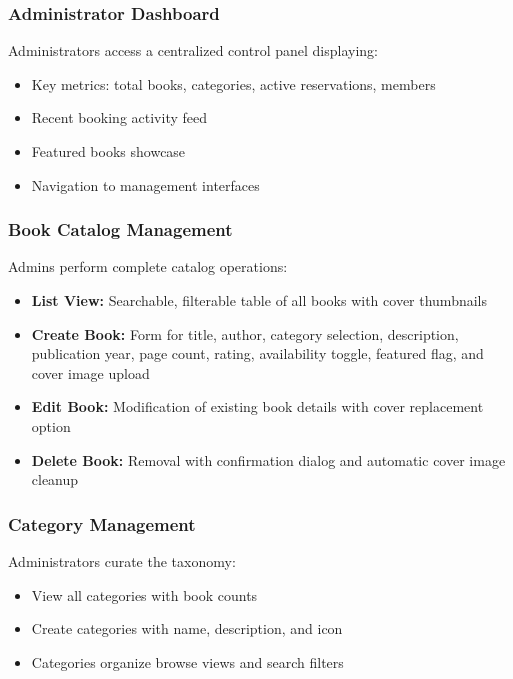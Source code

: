 \documentclass[12pt,a4paper]{article}
\begin{document}
\subsubsection{Administrator Dashboard}

Administrators access a centralized control panel displaying:

\begin{itemize}[leftmargin=*]
    \item Key metrics: total books, categories, active reservations, members
    \item Recent booking activity feed
    \item Featured books showcase
    \item Navigation to management interfaces
\end{itemize}

\subsubsection{Book Catalog Management}

Admins perform complete catalog operations:

\begin{itemize}[leftmargin=*]
    \item \textbf{List View:} Searchable, filterable table of all books with cover thumbnails
    \item \textbf{Create Book:} Form for title, author, category selection, description, publication year, page count, rating, availability toggle, featured flag, and cover image upload
    \item \textbf{Edit Book:} Modification of existing book details with cover replacement option
    \item \textbf{Delete Book:} Removal with confirmation dialog and automatic cover image cleanup
\end{itemize}

\subsubsection{Category Management}

Administrators curate the taxonomy:

\begin{itemize}[leftmargin=*]
    \item View all categories with book counts
    \item Create categories with name, description, and icon
    \item Categories organize browse views and search filters
\end{itemize}
\end{document}
